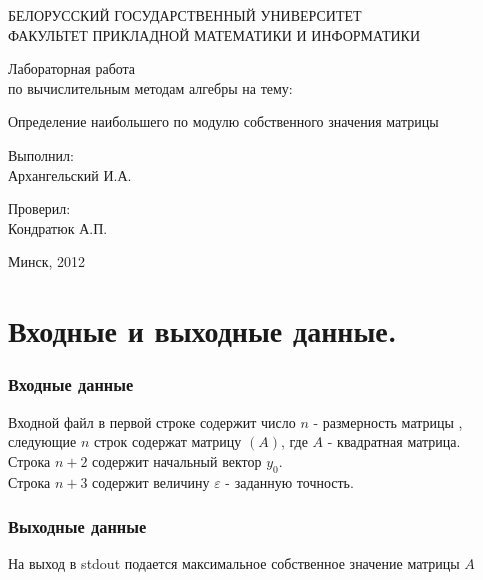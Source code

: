 \documentclass[a4paper,11pt]{article}
\author{Архангельский Илья}
\begin{document}
\begin{titlepage}
	\begin{center}
		БЕЛОРУССКИЙ ГОСУДАРСТВЕННЫЙ УНИВЕРСИТЕТ \\
		ФАКУЛЬТЕТ ПРИКЛАДНОЙ МАТЕМАТИКИ И ИНФОРМАТИКИ
	\end{center}
	\vspace{10em}
	\begin{center}
		\LARGE {Лабораторная работа \\
		по вычислительным методам алгебры на тему:}
		\linebreak	 
		
    Определение наибольшего по модулю собственного значения матрицы
	\end{center}
	\vspace{3em}
	\begin{flushright}
	  
	
 	Выполнил: \\	Архангельский И.А. \\ 
 	
 	  \vspace{1em}
 	
 	  Проверил: \\ Кондратюк А.П. \\
 	
	\end{flushright}
	
	\vfill
	\begin{center}
		Минск, 2012
	\end{center}
\end{titlepage} 

\newpage
\part*{Входные и выходные данные.} 
\section*{Входные данные}
Входной файл в первой строке содержит число $n$ - размерность матрицы , следующие $n$ строк содержат матрицу $(A)$, где  
  $A$ - квадратная матрица. \\
Строка $n+2$ содержит начальный вектор $y_0$. \\
Строка $n+3$ содержит величину $\varepsilon$ - заданную точность.
\section*{Выходные данные}
На выход в stdout подается максимальное собственное значение матрицы $A$
\newpage
\end{document}

